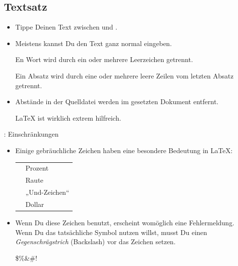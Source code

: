 \documentclass{beamer}
\begin{document}
\subsection{Textsatz}
\begin{frame}[fragile]{\insertsubsection{}}
\small
\begin{itemize}
\item Tippe Deinen Text zwischen  und .
\item Meistens kannst Du den Text ganz normal eingeben. 
\begin{exampletwouptiny}
En Wort wird durch ein oder 
mehrere Leerzeichen getrennt.

Ein Absatz wird durch eine oder 
mehrere leere Zeilen 
vom letzten Absatz getrennt.
\end{exampletwouptiny}
\item Abstände in der Quelldatei werden im gesetzten Dokument entfernt.
\begin{exampletwouptiny}
\LaTeX{}   ist           wirklich 
extrem     hilfreich.
\end{exampletwouptiny}
\end{itemize}
\end{frame}

\begin{frame}[fragile]{\insertsubsection{}: Einschränkungen}
\small
\begin{itemize}
\item Einige gebräuchliche Zeichen haben eine besondere Bedeutung in \LaTeX:\\[1ex]
\begin{tabular}{cl}
\keystrokebftt{\%} & Prozent           \\
\keystrokebftt{\#} & Raute  \\
\keystrokebftt{\&} & „Und-Zeichen“                 \\
\keystrokebftt{\$} & Dollar              \\
\end{tabular}
\item Wenn Du diese Zeichen benutzt, erscheint womöglich eine Fehlermeldung. 
Wenn Du das tatsächliche Symbol nutzen willst, musst Du einen 
\emph{Gegenschrägstrich} (Backslash) vor das Zeichen setzen. 
\begin{exampletwoup}
\$\%\&\#!
\end{exampletwoup}
\end{itemize}
\end{frame}
\end{document}

